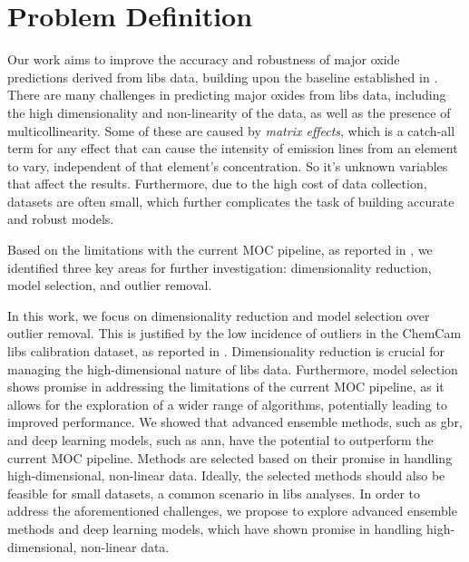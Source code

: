 \section{Problem Definition}
\label{sec:problem_definition}

Our work aims to improve the accuracy and robustness of major oxide predictions derived from \gls{libs} data, building upon the baseline established in \citet{p9_paper}.
There are many challenges in predicting major oxides from \gls{libs} data, including the high dimensionality and non-linearity of the data, as well as the presence of multicollinearity.
Some of these are caused by \textit{matrix effects}\cite{andersonImprovedAccuracyQuantitative2017}, which is a catch-all term for any effect that can cause the intensity of emission lines from an element to vary, independent of that element's concentration. So it's unknown variables that affect the results.
Furthermore, due to the high cost of data collection, datasets are often small, which further complicates the task of building accurate and robust models.

Based on the limitations with the current MOC pipeline, as reported in \cite{p9_paper}, we identified three key areas for further investigation: dimensionality reduction, model selection, and outlier removal.

In this work, we focus on dimensionality reduction and model selection over outlier removal.
This is justified by the low incidence of outliers in the ChemCam \gls{libs} calibration dataset, as reported in \cite{p9_paper}.
Dimensionality reduction is crucial for managing the high-dimensional nature of \gls{libs} data. %
Furthermore, model selection shows promise in addressing the limitations of the current MOC pipeline, as it allows for the exploration of a wider range of algorithms, potentially leading to improved performance.
We showed that advanced ensemble methods, such as \gls{gbr}, and deep learning models, such as \gls{ann}, have the potential to outperform the current MOC pipeline.
Methods are selected based on their promise in handling high-dimensional, non-linear data. Ideally, the selected methods should also be feasible for small datasets, a common scenario in \gls{libs} analyses. 
In order to address the aforementioned challenges, we propose to explore advanced ensemble methods and deep learning models, which have shown promise in handling high-dimensional, non-linear data.

